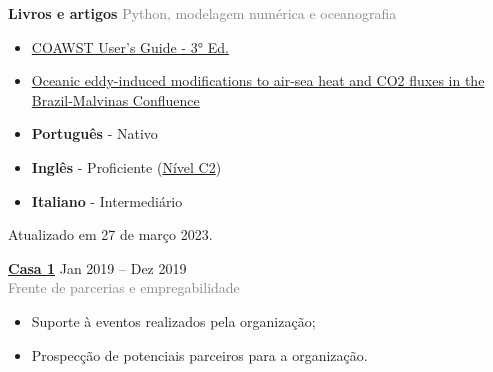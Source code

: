 \documentclass[9pt]{developercv} %
\begin{document}
\begin{minipage}[t]{0.3\textwidth}
	\vspace{-\baselineskip} %
	
	
	\textbf{Livros e artigos} %
	\textcolor{gray}{Python, modelagem numérica e oceanografia}
	 \begin{itemize}
		\item \small\textcolor{bleu_cite}{\href{http://mtc-m21c.sid.inpe.br/col/sid.inpe.br/mtc-m21c/2020/10.02.15.11/doc/publicacao.pdf}{COAWST User's Guide - 3° Ed.}}
		\item \small\textcolor{bleu_cite}{\href{https://www.nature.com/articles/s41598-021-89985-9}{Oceanic eddy-induced modifications to air-sea heat and CO2 fluxes in the Brazil-Malvinas Confluence}}
	 \end{itemize}  
\end{minipage}
\hfill
\begin{minipage}[t]{0.3\textwidth}
	\vspace{-\baselineskip} %

	\vspace{-0.3cm}
	\begin{itemize}
	\itemsep0em
	\item \textbf{Português} - Nativo
	\item \textbf{Inglês} - Proficiente (\href{https://www.efset.org/cert/PrWqbW}{\textcolor{bleu_cite}{Nível C2}})
	\item \textbf{Italiano} - Intermediário 
	\end{itemize}
	\vspace{1,7cm}
	
	\centering\tiny Atualizado em 27 de março 2023.
\end{minipage}
\hfill
\begin{minipage}[t]{0.3\textwidth}
	\vspace{-\baselineskip} %


	\textbf{\textcolor{bleu_cite}{\href{https://www.casaum.org/}{Casa 1}} } \hspace{1.cm} Jan 2019 --  Dez 2019\\
	\textcolor{gray}{Frente de parcerias e empregabilidade}
	\begin{itemize}
		\item Suporte à eventos realizados pela organização;
		\item Prospecção de potenciais parceiros para a organização.
	\end{itemize}
\end{minipage}


\end{document}
